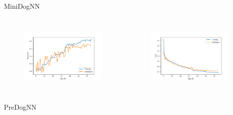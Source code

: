   \begin{frame}{MiniDogNN}
    \begin{columns}[c]
      \begin{figure}
        \centering
        \includegraphics[width=\textwidth]{logos/history_acc_mini.pdf}
        \label{fig:acc_mini}
      \end{figure}
      \begin{figure}
        \centering
        \includegraphics[width=\textwidth]{logos/history_loss_mini.pdf}
        \label{fig:loss_mini}
      \end{figure}
    \end{columns}
  \end{frame}

  \begin{frame}{PreDogNN}
    \begin{columns}[c]
    \end{columns}
  \end{frame}

